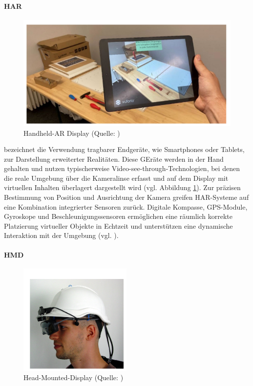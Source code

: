 \paragraph{\ac{HAR}}

\begin{figure}[ht]
\centering
\includegraphics[width=0.5\linewidth]{content/pictures/handheld-ar.PNG}
\caption{Handheld-AR Display (Quelle: \citealp[S. 318]{leins_comparing_2024})}
\label{fig:handheld-ar}
\end{figure}

bezeichnet die Verwendung tragbarer Endgeräte, wie Smartphones oder Tablets, zur Darstellung erweiterter Realitäten. Diese GEräte werden in der Hand gehalten und nutzen typischerweise Video-see-through-Technologien, bei denen die reale Umgebung über die Kameralinse erfasst und auf dem Display mit virtuellen Inhalten überlagert dargestellt wird (vgl. Abbildung \ref{fig:handheld-ar}). Zur präzisen Bestimmung von Position und Ausrichtung der Kamera greifen \ac{HAR}-Systeme auf eine Kombination integrierter Sensoren zurück. Digitale Kompasse, GPS-Module, Gyroskope und Beschleunigungssensoren ermöglichen eine räumlich korrekte Platzierung virtueller Objekte in Echtzeit und unterstützen eine dynamische Interaktion mit der Umgebung (vgl. \citealp[S. 347]{carmigniani_augmented_2011}).

\paragraph{\ac{HMD}}

\begin{figure}[ht]
\centering
\includegraphics[width=0.5\linewidth]{content/pictures/hmd-ar.PNG}
\caption{Head-Mounted-Display (Quelle: \citealp[S. 4]{reitmayr_location_2003})}
\label{fig:hmd-ar}
\end{figure}

